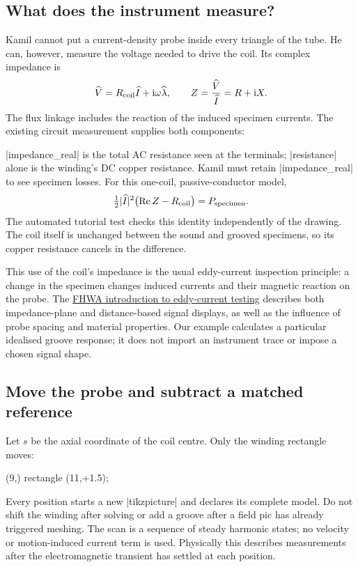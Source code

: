 \subsection{What does the instrument measure?}
Kamil cannot put a current-density probe inside every triangle of the tube.
He can, however, measure the voltage needed to drive the coil. Its complex
impedance is
\[
 \widehat V=R_{\rm coil}\widehat I+\mathrm i\omega\widehat\lambda,
 \qquad Z=\frac{\widehat V}{\widehat I}=R+\mathrm iX.
\]
The flux linkage includes the reaction of the induced specimen currents.
The existing circuit measurement supplies both components:
\begin{codeexample}
\femmmeasure[name=probe-reading,quantity=circuit,circuit=probe]
\end{codeexample}
|impedance_real| is the total AC resistance seen at the terminals;
|resistance| alone is the winding's DC copper resistance. Kamil must retain
|impedance_real| to see specimen losses. For this one-coil, passive-conductor
model,
\[
 \tfrac12|\widehat I|^2\bigl(\mathop{\rm Re}Z-R_{\rm coil}\bigr)
 =P_{\rm specimen}.
\]
The automated tutorial test checks this identity independently of the drawing.
The coil itself is unchanged between the sound and grooved specimens, so
its copper resistance cancels in the difference.

This use of the coil's impedance is the usual eddy-current inspection
principle: a change in the specimen changes induced currents and their
magnetic reaction on the probe. The
\href{https://infotechnology.fhwa.dot.gov/eddy-current-testing/}{FHWA introduction
to eddy-current testing} describes both impedance-plane and distance-based
signal displays, as well as the influence of probe spacing and material
properties. Our example calculates a particular idealised groove response;
it does not import an instrument trace or impose a chosen signal shape.

\subsection{Move the probe and subtract a matched reference}
Let $s$ be the axial coordinate of the coil centre. Only the winding rectangle
moves:
\begin{codeexample}
\path[femm/region={material=copper,circuit=probe,turns=60,
  winding fill=.6,mesh size=\Mesh}]
  (9,{}) rectangle (11,{\Position+1.5});
\femmmeasure[name=\Case-\Index,quantity=circuit,circuit=probe,
  parameter=\Position]
\end{codeexample}
Every position starts a new |tikzpicture| and declares its complete model.
Do not shift the winding after solving or add a groove after a field pic has
already triggered meshing. The scan is a sequence of steady harmonic states;
no velocity or motion-induced current term is used. Physically this describes
measurements after the electromagnetic transient has settled at each position.

